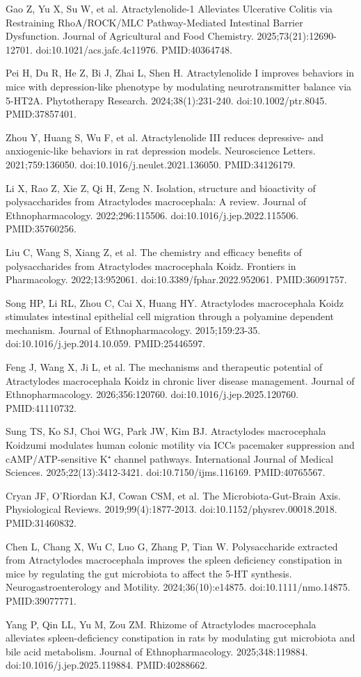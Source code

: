 \documentclass[11pt,oneside]{book}
\newcommand{\reff}[2]{\par\hangindent=7mm\hangafter=1\noindent[#1]\hspace{2mm}#2\par}
\begin{document}
\reff{10}{Gao Z, Yu X, Su W, et al. Atractylenolide-1 Alleviates Ulcerative Colitis via Restraining RhoA/ROCK/MLC Pathway-Mediated Intestinal Barrier Dysfunction. Journal of Agricultural and Food Chemistry. 2025;73(21):12690-12701. doi:10.1021/acs.jafc.4c11976. PMID:40364748.}
\reff{11}{Pei H, Du R, He Z, Bi J, Zhai L, Shen H. Atractylenolide I improves behaviors in mice with depression-like phenotype by modulating neurotransmitter balance via 5-HT2A. Phytotherapy Research. 2024;38(1):231-240. doi:10.1002/ptr.8045. PMID:37857401.}
\reff{12}{Zhou Y, Huang S, Wu F, et al. Atractylenolide III reduces depressive- and anxiogenic-like behaviors in rat depression models. Neuroscience Letters. 2021;759:136050. doi:10.1016/j.neulet.2021.136050. PMID:34126179.}
\reff{13}{Li X, Rao Z, Xie Z, Qi H, Zeng N. Isolation, structure and bioactivity of polysaccharides from Atractylodes macrocephala: A review. Journal of Ethnopharmacology. 2022;296:115506. doi:10.1016/j.jep.2022.115506. PMID:35760256.}
\reff{14}{Liu C, Wang S, Xiang Z, et al. The chemistry and efficacy benefits of polysaccharides from Atractylodes macrocephala Koidz. Frontiers in Pharmacology. 2022;13:952061. doi:10.3389/fphar.2022.952061. PMID:36091757.}
\reff{15}{Song HP, Li RL, Zhou C, Cai X, Huang HY. Atractylodes macrocephala Koidz stimulates intestinal epithelial cell migration through a polyamine dependent mechanism. Journal of Ethnopharmacology. 2015;159:23-35. doi:10.1016/j.jep.2014.10.059. PMID:25446597.}
\reff{16}{Feng J, Wang X, Ji L, et al. The mechanisms and therapeutic potential of Atractylodes macrocephala Koidz in chronic liver disease management. Journal of Ethnopharmacology. 2026;356:120760. doi:10.1016/j.jep.2025.120760. PMID:41110732.}
\reff{17}{Sung TS, Ko SJ, Choi WG, Park JW, Kim BJ. Atractylodes macrocephala Koidzumi modulates human colonic motility via ICCs pacemaker suppression and cAMP/ATP-sensitive K⁺ channel pathways. International Journal of Medical Sciences. 2025;22(13):3412-3421. doi:10.7150/ijms.116169. PMID:40765567.}
\reff{18}{Cryan JF, O'Riordan KJ, Cowan CSM, et al. The Microbiota-Gut-Brain Axis. Physiological Reviews. 2019;99(4):1877-2013. doi:10.1152/physrev.00018.2018. PMID:31460832.}
\reff{19}{Chen L, Chang X, Wu C, Luo G, Zhang P, Tian W. Polysaccharide extracted from Atractylodes macrocephala improves the spleen deficiency constipation in mice by regulating the gut microbiota to affect the 5-HT synthesis. Neurogastroenterology and Motility. 2024;36(10):e14875. doi:10.1111/nmo.14875. PMID:39077771.}
\reff{20}{Yang P, Qin LL, Yu M, Zou ZM. Rhizome of Atractylodes macrocephala alleviates spleen-deficiency constipation in rats by modulating gut microbiota and bile acid metabolism. Journal of Ethnopharmacology. 2025;348:119884. doi:10.1016/j.jep.2025.119884. PMID:40288662.}
\end{document}
